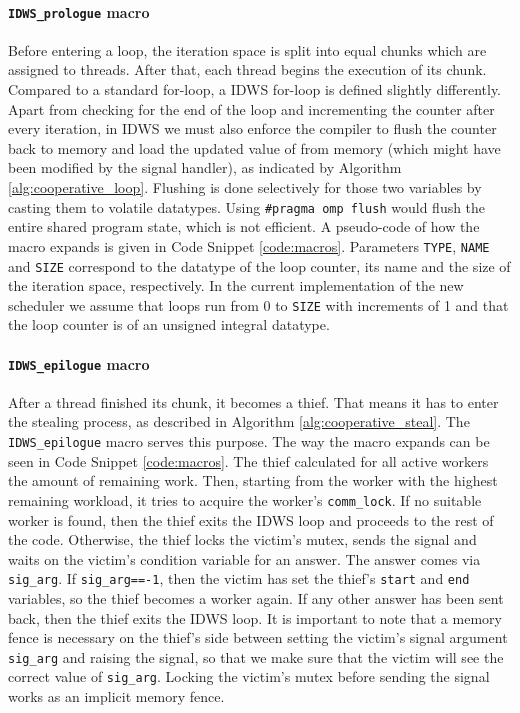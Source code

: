 \documentclass{acm_proc_article-sp}
\begin{document}
\paragraph{\texttt{IDWS\_prologue} macro}
Before entering a loop, the iteration space is split into equal chunks which 
are assigned to threads. After that, each thread begins the execution of its 
chunk. Compared to a standard for-loop, a IDWS for-loop is defined slightly 
differently. Apart from checking for the end of the loop and incrementing the 
counter after every iteration, in IDWS we must also enforce the compiler to 
flush the counter back to memory and load the updated value of  from 
memory (which might have been modified by the signal handler), as indicated by 
Algorithm \ref{alg:cooperative_loop}. Flushing is done selectively for those 
two variables by casting them to volatile datatypes. Using \texttt{\#pragma omp 
flush} would flush the entire shared program state, which is not efficient. A 
pseudo-code of how the macro expands is given in Code Snippet 
\ref{code:macros}. Parameters \texttt{TYPE}, \texttt{NAME} and \texttt{SIZE} 
correspond to the datatype of the loop counter, its name and the size of the 
iteration space, respectively. In the current implementation of the new 
scheduler we assume that loops run from 0 to \texttt{SIZE} with increments of 1 
and that the loop counter is of an unsigned integral datatype.

\paragraph{\texttt{IDWS\_epilogue} macro}
After a thread finished its chunk, it becomes a thief. That means it has to 
enter the stealing process, as described in Algorithm 
\ref{alg:cooperative_steal}. The \texttt{IDWS\_epilogue} macro serves this 
purpose. The way the macro expands can be seen in Code Snippet 
\ref{code:macros}. The thief calculated for all active workers the amount of 
remaining work. Then, starting from the worker with the highest remaining 
workload, it tries to acquire the worker's \texttt{comm\_lock}. If no suitable 
worker is found, then the thief exits the IDWS loop and proceeds to the rest of 
the code. Otherwise, the thief locks the victim's mutex, sends the signal and 
waits on the victim's condition variable for an answer. The answer comes via 
\texttt{sig\_arg}. If \texttt{sig\_arg==-1}, then the victim has set the 
thief's \texttt{start} and \texttt{end} variables, so the thief becomes a 
worker again. If any other answer has been sent back, then the thief exits the 
IDWS loop. It is important to note that a memory fence is necessary on the
thief's side between setting the victim's signal argument \texttt{sig\_arg} and
raising the signal, so that we make sure that the victim will see the correct
value of \texttt{sig\_arg}. Locking the victim's mutex before sending the signal
works as an implicit memory fence.
\end{document}
